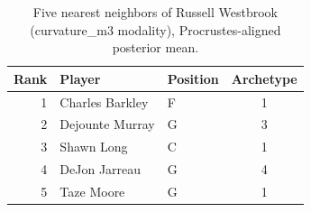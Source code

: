 \begin{table}[htbp]
  \centering\small
  \begin{tabular}{rllc}
    \toprule
    Rank & Player & Position & Archetype \\
    \midrule
    1 & Charles Barkley & F & 1 \\
    2 & Dejounte Murray & G & 3 \\
    3 & Shawn Long & C & 1 \\
    4 & DeJon Jarreau & G & 4 \\
    5 & Taze Moore & G & 1 \\
    \bottomrule
  \end{tabular}
  \caption{Five nearest neighbors of Russell Westbrook (curvature_m3 modality), Procrustes-aligned posterior mean.}
  \label{tab:Russell_Westbrook_neighbors_curvature_m3}
\end{table}

